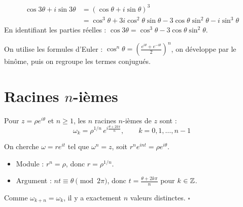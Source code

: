 \begin{exbox}
\begin{align*}
  \cos 3\theta + i\sin 3\theta &= (\cos\theta + i\sin\theta)^3 \\
  &= \cos^3\theta + 3i\cos^2\theta\sin\theta - 3\cos\theta\sin^2\theta - i\sin^3\theta
\end{align*}
En identifiant les parties réelles : $\cos 3\theta = \cos^3\theta - 3\cos\theta\sin^2\theta$.
\end{exbox}

\begin{methodbox}
On utilise les formules d'Euler : $\cos^n\theta = \left(\frac{e^{i\theta} + e^{-i\theta}}{2}\right)^n$, on développe par le binôme, puis on regroupe les termes conjugués.
\end{methodbox}


\section{Racines $n$-ièmes}

\begin{propbox}
Pour $z = \rho e^{i\theta}$ et $n \geqslant 1$, les $n$ racines $n$-ièmes de $z$ sont :
\[
  \omega_k = \rho^{1/n} \, e^{i\frac{\theta + 2k\pi}{n}}, \qquad k = 0, 1, \ldots, n-1
\]
\end{propbox}

\begin{proofbox}
On cherche $\omega = re^{it}$ tel que $\omega^n = z$, soit $r^n e^{int} = \rho e^{i\theta}$.
\begin{itemize}[leftmargin=1cm]
  \item Module : $r^n = \rho$, donc $r = \rho^{1/n}$.
  \item Argument : $nt \equiv \theta \pmod{2\pi}$, donc $t = \frac{\theta + 2k\pi}{n}$ pour $k \in \mathbb{Z}$.
\end{itemize}
Comme $\omega_{k+n} = \omega_k$, il y a exactement $n$ valeurs distinctes. \hfill$\square$
\end{proofbox}

\begin{center}
\end{center}

